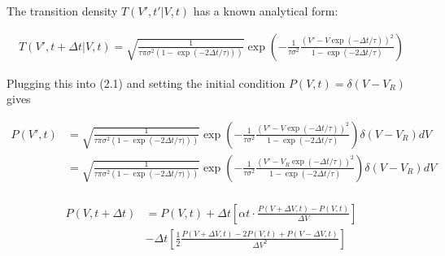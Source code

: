 \documentclass{ucetd}
\begin{document}
The transition density $T(V',t'|V,t)$ has a known analytical form:

\begin{align*}
T(V',t+\Delta t|V,t) = \sqrt{\frac{1}{\tau\pi\sigma^{2}(1-\exp\left(-2\Delta t/\tau)\right))}}\exp\left(-\frac{1}{\tau\sigma^{2}}\frac{(V'-V\exp(-\Delta t/\tau))^{2}}{1-\exp\left(-2\Delta t/\tau\right)}\right)
\end{align*} 

Plugging this into (2.1) and setting the initial condition $P(V,t) = \delta(V-V_{R})$ gives

\begin{align*}
P(V', t) &= \sqrt{\frac{1}{\tau\pi\sigma^{2}(1-\exp\left(-2\Delta t/\tau)\right))}}\exp\left(-\frac{1}{\tau\sigma^{2}}\frac{(V'-V\exp(-\Delta t/\tau))^{2}}{1-\exp\left(-2\Delta t/\tau\right)}\right)\delta(V-V_{R})dV\\
&= \sqrt{\frac{1}{\tau\pi\sigma^{2}(1-\exp\left(-2\Delta t/\tau)\right))}}\exp\left(-\frac{1}{\tau\sigma^{2}}\frac{(V'-V_{R}\exp(-\Delta t/\tau))^{2}}{1-\exp\left(-2\Delta t/\tau\right)}\right)\delta(V-V_{R})dV\\
\end{align*} 

\begin{align*}
P(V, t+\Delta t) &= P(V,t)+ \Delta t\left[\alpha t\cdot \frac{P(V+\Delta V, t) - P(V,t)}{\Delta V}\right] \\
&- \Delta t\left[\frac{1}{2}\frac{P(V+\Delta V, t) - 2P(V,t) + P(V-\Delta V, t)}{\Delta V^{2}}\right]
\end{align*} 
\end{document}

